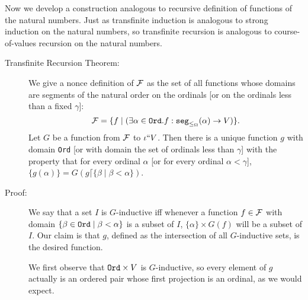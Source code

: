 \documentclass[12pt]{book}
\begin{document}
Now we develop a construction analogous to recursive definition of
functions of the natural numbers.  Just as transfinite induction is
analogous to strong induction on the natural numbers, so transfinite
recursion is analogous to course-of-values recursion on the natural
numbers.

\begin{description}

\item[Transfinite Recursion Theorem:] We give a nonce definition of
$\cal F$ as the set of all functions whose domains are segments of the
natural order on the ordinals [or on the ordinals less than a fixed
$\gamma$]: $${\cal F} = \{f \mid (\exists \alpha \in {\tt
Ord}.f:{\tt seg}_{\leq_{\Omega}}(\alpha)\rightarrow V)\}.$$ Let $G$
be a function from $\cal F$ to $\iota``V$.  Then there is a unique
function $g$ with domain {\tt Ord} [or with domain the set of ordinals
less than $\gamma$] with the property that for every ordinal $\alpha$
[or for every ordinal $\alpha<\gamma$], $\{g(\alpha)\} = G(g \lceil \{\beta\mid\beta<\alpha\})$.

\item[Proof:] 

We say that a set $I$ is $G$-inductive iff whenever a function $f \in
{\cal F}$ with domain $\{\beta\in {\tt Ord}\mid\beta<\alpha\}$ is a subset of $I$,
$\{\alpha\} \times G(f)$ will be a subset of $I$.  Our claim is that
$g$, defined as the intersection of all $G$-inductive sets, is the
desired function.

We first observe that ${\tt Ord}\times V$ is $G$-inductive, so every
element of $g$ actually is an ordered pair whose first projection is
an ordinal, as we would expect.


\end{description}
\end{document}
